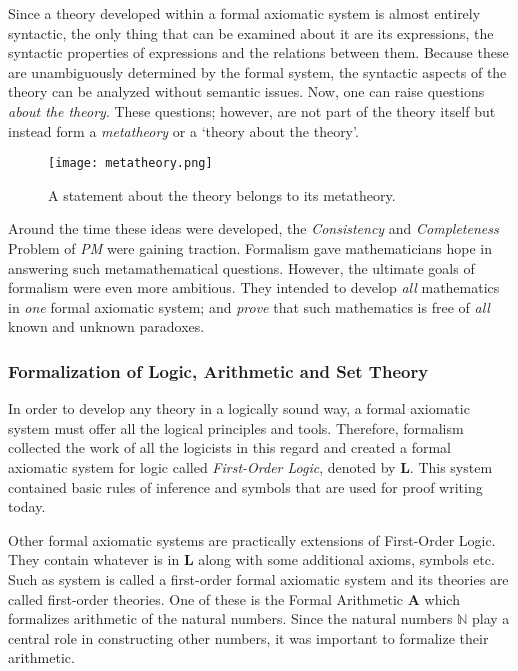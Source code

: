 \documentclass[a4paper, 12pt]{article}
\theoremstyle{definition}
\begin{document}
    Since a theory developed within a formal axiomatic system is almost entirely syntactic, the only thing 
    that can be examined about it are its expressions, the syntactic properties of expressions and the relations between them.
    Because these are unambiguously determined by the formal system, the syntactic aspects of the theory can be analyzed without semantic issues. 
    Now, one can raise questions \textit{about the theory}. These questions; however, are not part of the theory itself 
    but instead form a \textit{metatheory} or a `theory about the theory'.

    \begin{figure}[h]
        \centering 
        \texttt{[image: metatheory.png]}
        \caption{A statement about the theory belongs to its metatheory.}
    \end{figure}

    Around the time these ideas were developed, the \textit{Consistency} and \textit{Completeness} Problem of \textit{PM} were
    gaining traction. Formalism gave mathematicians hope in answering such metamathematical questions. However, 
    the ultimate goals of formalism were even more ambitious. They intended to develop \emph{all} 
    mathematics in \textit{one} formal axiomatic system; and \textit{prove} that such mathematics is free of \textit{all} known and unknown paradoxes. 

    \subsubsection*{Formalization of Logic, Arithmetic and Set Theory}
    In order to develop any theory in a logically sound way, a formal axiomatic system must offer all the logical principles and tools. 
    Therefore, formalism collected the work of all the logicists in this regard and created a formal axiomatic system for logic 
    called \textit{First-Order Logic}, denoted by $\mathbf{L}$. This system contained basic rules of inference and 
    symbols that are used for proof writing today. 
    
    Other formal axiomatic systems are practically extensions of First-Order Logic. They contain whatever is in $\mathbf{L}$
    along with some additional axioms, symbols etc. Such as system is called a first-order formal axiomatic system and its theories are called first-order theories.
    One of these is the Formal Arithmetic $\mathbf{A}$ which formalizes arithmetic of the natural numbers. Since the natural numbers $\mathbb{N}$ play 
    a central role in constructing other numbers, it was important to formalize their arithmetic. 
\end{document}
